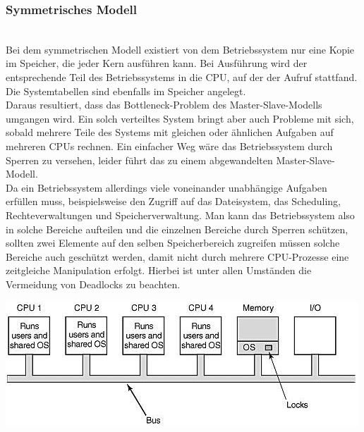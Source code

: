 \subsubsection{Symmetrisches Modell} \quad \\
Bei dem symmetrischen Modell existiert von dem Betriebssystem nur eine Kopie im Speicher, die jeder Kern 
ausführen kann. Bei Ausführung wird der entsprechende Teil des Betriebssystems in die CPU, auf der der 
Aufruf stattfand. \cite{tanenb2009} Die Systemtabellen sind ebenfalls im Speicher angelegt. \\
Daraus resultiert, dass das Bottleneck-Problem des Master-Slave-Modells umgangen wird. Ein solch verteiltes 
System bringt aber auch Probleme mit sich, sobald mehrere Teile des Systems mit gleichen oder ähnlichen 
Aufgaben auf mehreren CPUs rechnen. Ein einfacher Weg wäre das Betriebssystem durch Sperren zu 
versehen, leider führt das zu einem abgewandelten Master-Slave-Modell. \\
Da ein Betriebssystem allerdings viele voneinander unabhängige Aufgaben erfüllen muss, beispielsweise den 
Zugriff auf das Dateisystem, das Scheduling, Rechteverwaltungen und  Speicherverwaltung. Man kann das 
Betriebssystem also in solche Bereiche aufteilen und die einzelnen Bereiche durch Sperren schützen, sollten 
zwei Elemente auf den selben Speicherbereich zugreifen müssen solche Bereiche auch geschützt werden, damit 
nicht durch mehrere CPU-Prozesse eine zeitgleiche Manipulation erfolgt. Hierbei ist unter allen Umständen 
die Vermeidung von Deadlocks zu beachten. \\
\begin{center}
	\includegraphics[scale=0.75]{Nachname/pics/symm} \cite{sureshPic}
\end{center}
